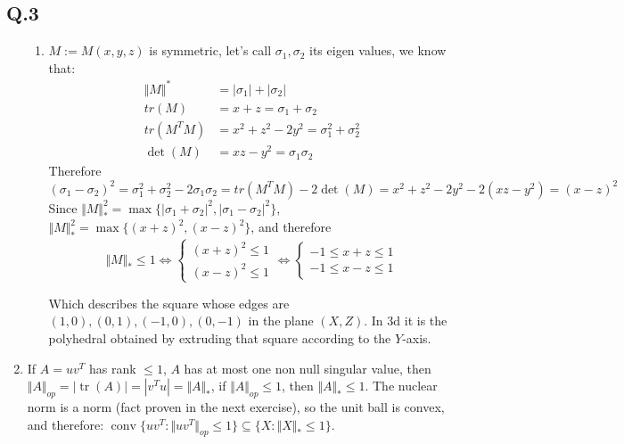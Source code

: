 \documentclass[12pt]{article}\usepackage[]{graphicx}\usepackage[]{color}
\newcommand{\Q}[1]{\subsection*{Q.#1}}
\newenvironment{question}[1]
{\Q{#1}}{}
\DeclareMathOperator{\tr}{tr}
\DeclareMathOperator{\conv}{conv}
\begin{document}
\begin{question}{3}
\begin{enumerate}
\begin{enumerate}
    \item $M := M(x, y, z)$ is symmetric, let's call $\sigma_1, \sigma_2$ its eigen values, we know that:
      \begin{align*}
        \Vert M\Vert ^* &= |\sigma_1| + |\sigma_2| \\
        tr(M) &= x + z = \sigma_1 + \sigma_2 \\
        tr(M^TM) &= x^2 + z^2 - 2y^2 = \sigma_1^2 + \sigma_2^2\\
        \det(M) &= xz - y^2 = \sigma_1 \sigma_2
      \end{align*}
      Therefore $(\sigma_1 - \sigma_2)^2 = \sigma_1^2 + \sigma_2^2 - 2 \sigma_1\sigma_2 = tr(M^TM) - 2\det(M) = x^2 + z^2 - 2y^2 - 2(xz - y^2) = (x - z)^2$
      Since $\Vert M\Vert _*^2 = \max \{ |\sigma_1 + \sigma_2|^2, |\sigma_1 - \sigma_2|^2\}$, $\Vert M\Vert _*^2 = \max \{ (x+z)^2, (x-z)^2 \}$,
      and therefore \[ \Vert M\Vert _* \le 1 \iff \left\{ \begin{array}{c} (x+z)^2 \le 1\\ (x-z)^2 \le 1 \end{array} \right.  \iff \left\{ \begin{array}{c} -1 \le x+z \le 1\\ -1 \le x-z \le 1 \end{array} \right. \]

      Which describes the square whose edges are $(1, 0), (0, 1), (-1, 0), (0, -1)$ in the plane $(X, Z)$.
      In 3d it is the polyhedral obtained by extruding that square according to the $Y$-axis.
    \end{enumerate}

  \item If $A = uv^T$ has rank $\le 1$, $A$ has at most one non null singular value, then $\Vert A\Vert _{op} = |\tr(A)| = |v^Tu| = \Vert A\Vert _*$, if $\Vert A\Vert _{op} \le 1$, then $\Vert A\Vert _{*} \le 1$.
    The nuclear norm is a norm (fact proven in the next exercise), so the unit ball is convex, and therefore:
    $\conv \{ uv^T : \Vert uv^T\Vert _{op} \le 1 \} \subseteq \{ X : \Vert X\Vert _{*} \le  1\}$.


\end{enumerate}
\end{question}
\end{document}
